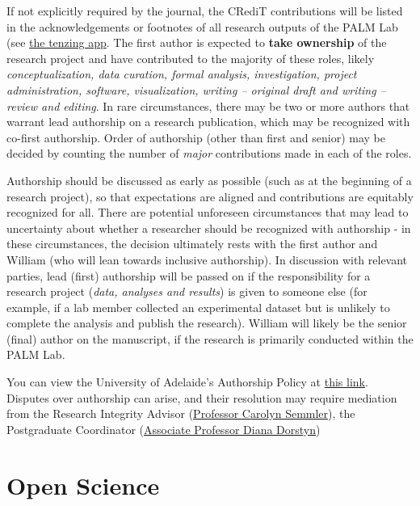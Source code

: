 \documentclass[
]{book}
\begin{document}
If not explicitly required by the journal, the CRediT contributions will be listed in the acknowledgements or footnotes of all research outputs of the PALM Lab (see \protect\hyperlink{tenzing}{the tenzing app}. The first author is expected to \textbf{take ownership} of the research project and have contributed to the majority of these roles, likely \emph{conceptualization, data curation, formal analysis, investigation, project administration, software, visualization, writing -- original draft and writing -- review and editing}. In rare circumstances, there may be two or more authors that warrant lead authorship on a research publication, which may be recognized with co-first authorship. Order of authorship (other than first and senior) may be decided by counting the number of \emph{major} contributions made in each of the roles.

Authorship should be discussed as early as possible (such as at the beginning of a research project), so that expectations are aligned and contributions are equitably recognized for all. There are potential unforeseen circumstances that may lead to uncertainty about whether a researcher should be recognized with authorship - in these circumstances, the decision ultimately rests with the first author and William (who will lean towards inclusive authorship). In discussion with relevant parties, lead (first) authorship will be passed on if the responsibility for a research project (\emph{data, analyses and results}) is given to someone else (for example, if a lab member collected an experimental dataset but is unlikely to complete the analysis and publish the research). William will likely be the senior (final) author on the manuscript, if the research is primarily conducted within the PALM Lab.

You can view the University of Adelaide's Authorship Policy at \href{https://www.adelaide.edu.au/policies/3503}{this link}. Disputes over authorship can arise, and their resolution may require mediation from the Research Integrity Advisor (\href{https://researchers.adelaide.edu.au/profile/carolyn.semmler}{Professor Carolyn Semmler}), the Postgraduate Coordinator (\href{https://www.adelaide.edu.au/directory/diana.dorstyn}{Associate Professor Diana Dorstyn})

\hypertarget{open-science}{%
\section{Open Science}\label{open-science}}
\end{document}
